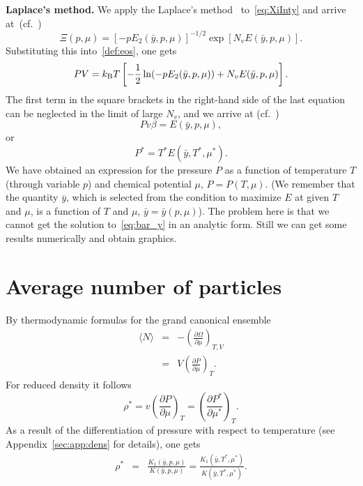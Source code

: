 \documentclass[12pt]{article}
\numberwithin{equation}{section}
\begin{document}
	\textbf{Laplace's method.} We apply the Laplace's method~\cite[(1.21)]{Fedoryuk89} to~\eqref{eq:XiInty} and arrive at~(cf.~\cite[(19)]{KD22})
	\begin{equation}
		\Xi(p,\mu) = [-p E_2(\bar{y},p,\mu)]^{-1/2} \exp[N_v E(\bar{y},p,\mu)].
	\end{equation}
	Substituting this into~\eqref{def:eos}, one gets
	\begin{equation}
		P V = k_{\rm B}T \left[-\frac{1}{2} \ln(-p E_2(\bar{y},p,\mu)) + N_v E(\bar{y},p,\mu)\right].
	\end{equation}
	The first term in the square brackets in the right-hand side of the last equation can be neglected in the limit of large $N_v$, and we arrive at (cf.~\cite[(2.27)]{KKD20})
	\begin{equation}
		P v \beta = E(\bar{y},p,\mu),
	\end{equation}
	or
	\begin{equation}
		\label{eos:reduced}
		P^* = T^* E(\bar{y},T^*,\mu^*).
	\end{equation}
	We have obtained an expression for the pressure $P$ as a function of temperature $T$ (through variable $p$) and chemical potential $\mu$, $P = P(T, \mu)$. (We remember that the quantity $\bar{y}$, which is selected from the condition to maximize $E$ at given $T$ and $\mu$, is a function of $T$ and $\mu$, $\bar{y} = \bar{y}(p,\mu)$). The problem here is that we cannot get the solution to~\eqref{eq:bar_y} in an analytic form. Still we can get some results numerically and obtain graphics.
	
	\section{Average number of particles}
	By thermodynamic formulas for the grand canonical ensemble
	\begin{eqnarray}
		\langle N \rangle & = & -\left(\frac{\partial \Omega}{\partial \mu}\right)_{T,V}
		\nonumber\\
		& = & V \left(\frac{\partial P}{\partial \mu}\right)_T.
	\end{eqnarray}
	For reduced density it follows
	\begin{equation}
		\label{eq:dens}
		\rho^* = v\left(\frac{\partial P}{\partial \mu}\right)_T = \left(\frac{\partial P^*}{\partial \mu^*}\right)_T.
	\end{equation}
	As a result of the differentiation of pressure with respect to temperature (see Appendix~\ref{sec:app:dens} for details), one gets
	\begin{eqnarray}
		\label{eq:densK}
		\rho^* &=& \frac{K_1(\bar{y}, p,\mu)}{K(\bar{y},p,\mu)} = \frac{K_1(\bar{y},T^*,\mu^*)}{K(\bar{y},T^*,\mu^*)}.
	\end{eqnarray}
	
\end{document}
